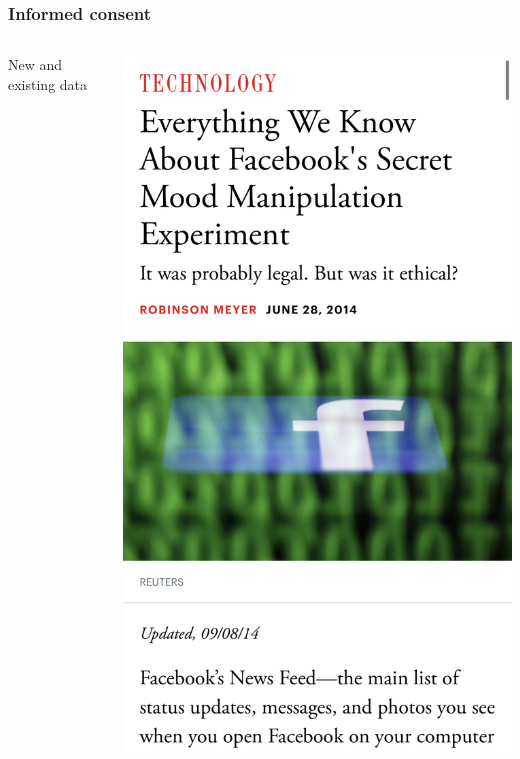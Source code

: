 \documentclass[main]{subfiles}
\begin{document}
\begin{frame}\frametitle{Informed consent}
\vspace{1em}
\begin{columns}
\begin{column}{0.3\textwidth}
\centering
New and existing data
\end{column}
\begin{column}{0.33\textwidth}
\centering
\includegraphics[width=\textwidth]{figures/news/facebook_emotional_contagion.png}

\end{column}
\end{columns}
\end{frame}
\end{document}
